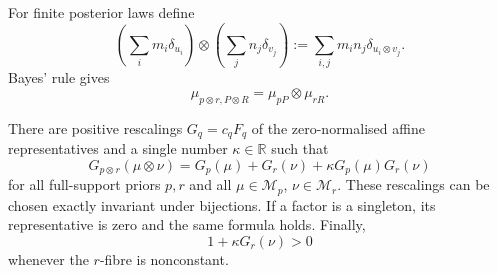 For finite posterior laws define
\[
 \left(\sum_i m_i\delta_{u_i}\right)\otimes
 \left(\sum_j n_j\delta_{v_j}\right)
 :=\sum_{i,j}m_i n_j\delta_{u_i\otimes v_j}.
\]
Bayes' rule gives
\begin{equation}
 \mu_{p\otimes r,P\otimes R}=\mu_{pP}\otimes\mu_{rR}.
\tag{PL}\label{pt:eq:productlaw}
\end{equation}

\begin{lemma}
\label{pt:lem:coherentnorm}\label{pt:cor:permutationinvariance}
There are positive rescalings $G_q=c_qF_q$ of the zero-normalised affine
representatives and a single number $\kappa\in\mathbb R$ such that
\begin{equation}
 G_{p\otimes r}(\mu\otimes\nu)
 =G_p(\mu)+G_r(\nu)+\kappa G_p(\mu)G_r(\nu)
\tag{QA}\label{pt:eq:QA}
\end{equation}
for all full-support priors $p,r$ and all
$\mu\in\mathcal M_p$, $\nu\in\mathcal M_r$.  These rescalings can be chosen
exactly invariant under bijections.  If a factor is a singleton, its
representative is zero and the same formula holds.  Finally,
\begin{equation}
 1+\kappa G_r(\nu)>0
\tag{POS}\label{pt:eq:QAslope}
\end{equation}
whenever the $r$-fibre is nonconstant.
\end{lemma}


